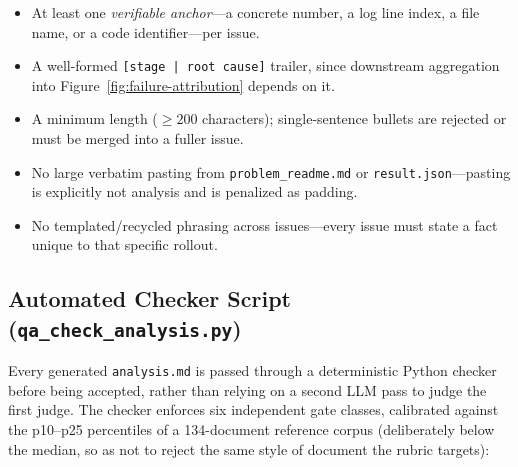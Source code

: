 \begin{itemize}
  \item At least one \emph{verifiable anchor}---a concrete number, a log
  line index, a file name, or a code identifier---per issue.
  \item A well-formed \texttt{[stage | root cause]} trailer, since
  downstream aggregation into
  Figure~\ref{fig:failure-attribution} depends on it.
  \item A minimum length ($\geq 200$ characters); single-sentence bullets
  are rejected or must be merged into a fuller issue.
  \item No large verbatim pasting from \texttt{problem\_readme.md} or
  \texttt{result.json}---pasting is explicitly not analysis and is
  penalized as padding.
  \item No templated/recycled phrasing across issues---every issue must
  state a fact unique to that specific rollout.
\end{itemize}

\subsection{Automated Checker Script (\texttt{qa\_check\_analysis.py})}
\label{app:evaluator:checker}

Every generated \texttt{analysis.md} is passed through a deterministic
Python checker before being accepted, rather than relying on a second LLM
pass to judge the first judge. The checker enforces six independent gate
classes, calibrated against the p10--p25 percentiles of a 134-document
reference corpus (deliberately below the median, so as not to reject the
same style of document the rubric targets):

